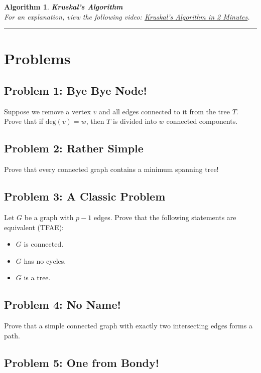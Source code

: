 \documentclass{article}
\newtheorem{algorithm}{Algorithm}
\begin{document}
\begin{algorithm}
    \textbf{Kruskal's Algorithm} \\
    For an explanation, view the following video: \href{https://www.youtube.com/watch?v=71UQH7Pr9kU}{Kruskal's Algorithm in 2 Minutes}.
\end{algorithm}

\vspace{20pt}
\hrule
\vspace{20pt}

\section*{Problems}

\subsection*{Problem 1: Bye Bye Node!}

Suppose we remove a vertex $v$ and all edges connected to it from the tree $T$. Prove that if $\text{deg}(v) = w$, then $T$ is divided into $w$ connected components.

\subsection*{Problem 2: Rather Simple}

Prove that every connected graph contains a minimum spanning tree!

\subsection*{Problem 3: A Classic Problem}

Let $G$ be a graph with $p-1$ edges. Prove that the following statements are equivalent (TFAE):
\begin{itemize}
    \item $G$ is connected.
    \item $G$ has no cycles.
    \item $G$ is a tree.
\end{itemize}

\subsection*{Problem 4: No Name!}

Prove that a simple connected graph with exactly two intersecting edges forms a path.

\subsection*{Problem 5: One from Bondy!}
\end{document}

